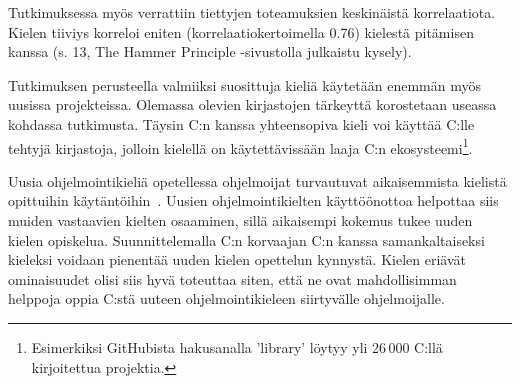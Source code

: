 Tutkimuksessa myös verrattiin tiettyjen toteamuksien keskinäistä korrelaatiota.
Kielen tiiviys korreloi eniten (korrelaatiokertoimella 0.76) kielestä pitämisen
kanssa (s. 13, The Hammer Principle -sivustolla julkaistu kysely).


Tutkimuksen perusteella valmiiksi suosittuja kieliä käytetään enemmän myös
uusissa projekteissa. Olemassa olevien kirjastojen tärkeyttä korostetaan
useassa kohdassa tutkimusta. Täysin C:n kanssa yhteensopiva kieli voi käyttää
C:lle tehtyjä kirjastoja, jolloin kielellä on käytettävissään laaja C:n
ekosysteemi\footnote{Esimerkiksi GitHubista hakusanalla 'library' löytyy yli
26\,000 C:llä kirjoitettua projektia.}.

Uusia ohjelmointikieliä opetellessa ohjelmoijat turvautuvat aikaisemmista
kielistä opittuihin käytäntöihin~\citep{languagelearning}. Uusien
ohjelmointikielten käyttöönottoa helpottaa siis muiden vastaavien kielten
osaaminen, sillä aikaisempi kokemus tukee uuden kielen opiskelua.
Suunnittelemalla C:n korvaajan C:n kanssa samankaltaiseksi kieleksi voidaan
pienentää uuden kielen opettelun kynnystä. Kielen eriävät ominaisuudet olisi
siis hyvä toteuttaa siten, että ne ovat mahdollisimman helppoja oppia C:stä
uuteen ohjelmointikieleen siirtyvälle ohjelmoijalle.


